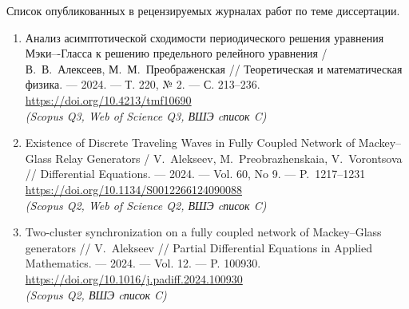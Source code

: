 \documentclass[a4paper,14pt,oneside,openany]{extarticle}
\begin{document}
	
	Список опубликованных в рецензируемых журналах работ по теме диссертации.
	\begin{enumerate}
		\item Анализ асимптотической сходимости периодического решения уравнения Мэки–-Гласса к решению предельного релейного уравнения / В.~В.~Алексеев, М.~М.~Преображенская // Теоретическая и математическая физика. --- 2024. --- Т. 220, № 2. --- С. 213--236.\\
		\href{https://doi.org/10.4213/tmf10690}{https://doi.org/10.4213/tmf10690}\\
		\emph{(Scopus Q3, Web of Science Q3, ВШЭ cписок C)}
		\item Existence of Discrete Traveling Waves in Fully Coupled Network of Mackey--Glass Relay Generators / V.~Alekseev, M.~Preobrazhenskaia, V.~Vorontsova // Differential Equations. --- 2024. --- Vol. 60, No 9. --- P.~1217--1231\\ \href{https://doi.org/10.1134/S0012266124090088}{https://doi.org/10.1134/S0012266124090088}\\
		\emph{(Scopus Q2, Web of Science Q2, ВШЭ cписок C)}
		\item Two-cluster synchronization on a fully coupled network of Mackey--Glass generators // V.~Alekseev // Partial Differential Equations in Applied Mathematics. --- 2024. --- Vol. 12. --- P. 100930.\\
		\href{https://doi.org/10.1016/j.padiff.2024.100930}{https://doi.org/10.1016/j.padiff.2024.100930}\\
		\emph{(Scopus Q2, ВШЭ cписок C)}
	\end{enumerate}
	
	
\end{document}
